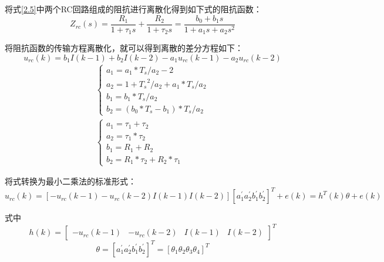 将式\ref{2.5}中两个RC回路组成的阻抗进行离散化得到如下式的阻抗函数：
\begin{equation}
{Z_{rc}}(s) = \frac{{{R_1}}}{{1 + {\tau _1}s}} + \frac{{{R_2}}}{{1 + {\tau _2}s}} = \frac{{{b_0} + {b_1}s}}{{1 + {a_1}s + {a_2}{s^2}}}
\end{equation}

将阻抗函数的传输方程离散化，就可以得到离散的差分方程如下：
\begin{equation}\label{2.7}
{u_{rc}}(k) = {b_1}I(k - 1) + {b_2}I(k - 2) - {a_1}{u_{rc}}(k - 1) - {a_2}{u_{rc}}(k - 2)
\end{equation}
\begin{equation}
\begin{array}{l}
\left\{ \begin{array}{l}
{a_1} = {a_1} * {T_s}/{a_2} - 2\\
{a_2} = 1 + {T_s}^2/{a_2} + {a_1} * {T_s}/{a_2}\\
{b_1} = {b_1} * {T_s}/{a_2}\\
{b_2} = ({b_0} * {T_s} - {b_1}) * {T_s}/{a_2}
\end{array} \right.\\
\left\{ \begin{array}{l}
{a_1} = {\tau _1} + {\tau _2}\\
{a_2} = {\tau _1} * {\tau _2}\\
{b_1} = {R_1} + {R_2}\\
{b_2} = {R_1} * {\tau _2} + {R_2} * {\tau _1}
\end{array} \right.
\end{array}
\end{equation}

将式\label{2.7}转换为最小二乘法的标准形式：
\begin{equation}
{{u}_{rc}}(k)=[-{{u}_{rc}}(k-1)-{{u}_{rc}}(k-2)I(k-1)I(k-2)]{{[a_{1}^{'}a_{2}^{'}b_{1}^{'}b_{2}^{'}]}^{T}}+e(k)={{h}^{T}}(k)\theta +e(k)
\end{equation}

式中
\begin{equation}
h(k) = {\left[ {\begin{array}{*{20}{c}}
{ - {u_{rc}}(k - 1)}&{ - {u_{rc}}(k - 2)}&{I(k - 1)}&{I(k - 2)}
\end{array}} \right]^T}
\end{equation}
\begin{equation}
\theta ={{\left[ a_{1}^{'}a_{2}^{'}b_{1}^{'}b_{2}^{'} \right]}^{T}}={{\left[ {{\theta }_{1}}{{\theta }_{2}}{{\theta }_{3}}{{\theta }_{4}} \right]}^{T}}
\end{equation}


